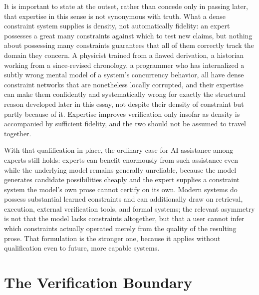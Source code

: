 \documentclass[11pt]{article}
\begin{document}
It is important to state at the outset, rather than concede only in passing later, that expertise in this sense is not synonymous with truth. What a dense constraint system supplies is density, not automatically fidelity: an expert possesses a great many constraints against which to test new claims, but nothing about possessing many constraints guarantees that all of them correctly track the domain they concern. A physicist trained from a flawed derivation, a historian working from a since-revised chronology, a programmer who has internalized a subtly wrong mental model of a system's concurrency behavior, all have dense constraint networks that are nonetheless locally corrupted, and their expertise can make them confidently and systematically wrong for exactly the structural reason developed later in this essay, not despite their density of constraint but partly because of it. Expertise improves verification only insofar as density is accompanied by sufficient fidelity, and the two should not be assumed to travel together.

With that qualification in place, the ordinary case for AI assistance among experts still holds: experts can benefit enormously from such assistance even while the underlying model remains generally unreliable, because the model generates candidate possibilities cheaply and the expert supplies a constraint system the model's own prose cannot certify on its own. Modern systems do possess substantial learned constraints and can additionally draw on retrieval, execution, external verification tools, and formal systems; the relevant asymmetry is not that the model lacks constraints altogether, but that a user cannot infer which constraints actually operated merely from the quality of the resulting prose. That formulation is the stronger one, because it applies without qualification even to future, more capable systems.

\section{The Verification Boundary}
\end{document}

